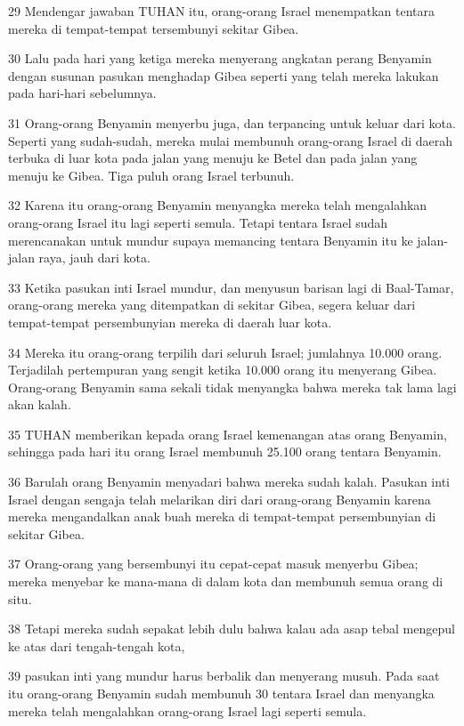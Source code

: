 \par 29 Mendengar jawaban TUHAN itu, orang-orang Israel menempatkan tentara mereka di tempat-tempat tersembunyi sekitar Gibea.
\par 30 Lalu pada hari yang ketiga mereka menyerang angkatan perang Benyamin dengan susunan pasukan menghadap Gibea seperti yang telah mereka lakukan pada hari-hari sebelumnya.
\par 31 Orang-orang Benyamin menyerbu juga, dan terpancing untuk keluar dari kota. Seperti yang sudah-sudah, mereka mulai membunuh orang-orang Israel di daerah terbuka di luar kota pada jalan yang menuju ke Betel dan pada jalan yang menuju ke Gibea. Tiga puluh orang Israel terbunuh.
\par 32 Karena itu orang-orang Benyamin menyangka mereka telah mengalahkan orang-orang Israel itu lagi seperti semula. Tetapi tentara Israel sudah merencanakan untuk mundur supaya memancing tentara Benyamin itu ke jalan-jalan raya, jauh dari kota.
\par 33 Ketika pasukan inti Israel mundur, dan menyusun barisan lagi di Baal-Tamar, orang-orang mereka yang ditempatkan di sekitar Gibea, segera keluar dari tempat-tempat persembunyian mereka di daerah luar kota.
\par 34 Mereka itu orang-orang terpilih dari seluruh Israel; jumlahnya 10.000 orang. Terjadilah pertempuran yang sengit ketika 10.000 orang itu menyerang Gibea. Orang-orang Benyamin sama sekali tidak menyangka bahwa mereka tak lama lagi akan kalah.
\par 35 TUHAN memberikan kepada orang Israel kemenangan atas orang Benyamin, sehingga pada hari itu orang Israel membunuh 25.100 orang tentara Benyamin.
\par 36 Barulah orang Benyamin menyadari bahwa mereka sudah kalah. Pasukan inti Israel dengan sengaja telah melarikan diri dari orang-orang Benyamin karena mereka mengandalkan anak buah mereka di tempat-tempat persembunyian di sekitar Gibea.
\par 37 Orang-orang yang bersembunyi itu cepat-cepat masuk menyerbu Gibea; mereka menyebar ke mana-mana di dalam kota dan membunuh semua orang di situ.
\par 38 Tetapi mereka sudah sepakat lebih dulu bahwa kalau ada asap tebal mengepul ke atas dari tengah-tengah kota,
\par 39 pasukan inti yang mundur harus berbalik dan menyerang musuh. Pada saat itu orang-orang Benyamin sudah membunuh 30 tentara Israel dan menyangka mereka telah mengalahkan orang-orang Israel lagi seperti semula.
